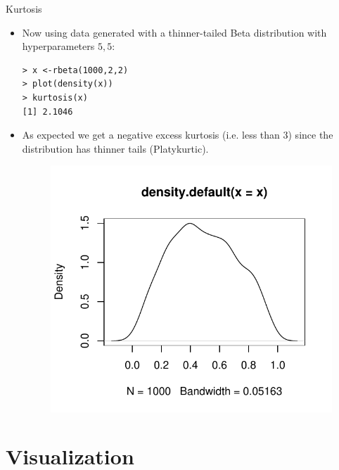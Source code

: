 \documentclass[handout]{beamer}
\begin{document}
\begin{frame}[fragile]{Kurtosis}

\scriptsize{
\begin{itemize} 
 \item Now using data generated with a thinner-tailed Beta distribution with hyperparameters $5,5$:
 
 \begin{verbatim}
> x <-rbeta(1000,2,2)
> plot(density(x))
> kurtosis(x)
[1] 2.1046
 \end{verbatim}

 \item  As expected we get a negative excess kurtosis (i.e. less than 3) since the distribution has thinner tails (Platykurtic). 
 
   \begin{figure}[h!]
	\centering
	\includegraphics[scale=0.4]{pics/kurt3.pdf}
	\end{figure} 
 
 
 
\end{itemize}

}

 
\end{frame}


\section{Visualization}
\end{document}
